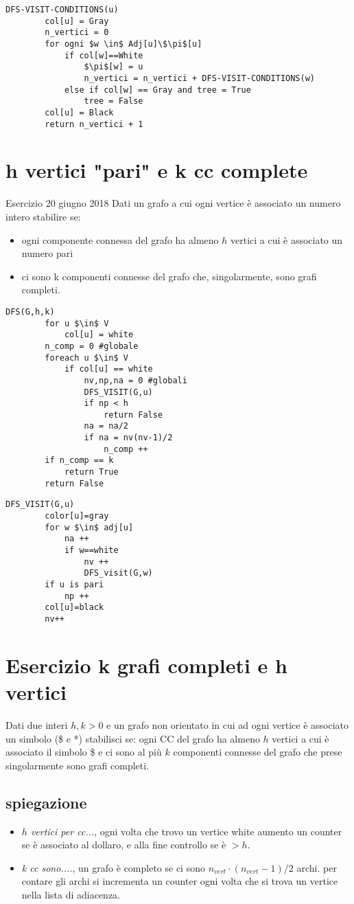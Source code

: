 \documentclass[12pt, a4paper, openany]{book}
\begin{document}
\begin{lstlisting}[mathescape=true]
    DFS-VISIT-CONDITIONS(u)
        col[u] = Gray
        n_vertici = 0
        for ogni $w \in$ Adj[u]\$\pi$[u]
            if col[w]==White
                $\pi$[w] = u
                n_vertici = n_vertici + DFS-VISIT-CONDITIONS(w)
            else if col[w] == Gray and tree = True
                tree = False
        col[u] = Black
        return n_vertici + 1
\end{lstlisting}

\section{h vertici "pari" e k cc complete} Esercizio 20 giugno 2018
Dati un grafo a cui ogni vertice è associato un numero intero stabilire se:
\begin{itemize}
	\item ogni componente connessa del grafo ha almeno $h$ vertici a cui è associato un numero pari
	\item ci sono k componenti connesse del grafo che, singolarmente, sono grafi completi.
\end{itemize}
\begin{lstlisting}[style = small]
	DFS(G,h,k)
		for u $\in$ V
			col[u] = white
		n_comp = 0 #globale
		foreach u $\in$ V
			if col[u] == white
				nv,np,na = 0 #globali
				DFS_VISIT(G,u)
				if np < h
					return False
				na = na/2
				if na = nv(nv-1)/2
					n_comp ++
		if n_comp == k
			return True
		return False
\end{lstlisting}

\begin{lstlisting}[style = small]
	DFS_VISIT(G,u)
		color[u]=gray
		for w $\in$ adj[u]
			na ++
			if w==white
				nv ++
				DFS_visit(G,w)
		if u is pari
			np ++
		col[u]=black
		nv++
\end{lstlisting}
\section{Esercizio k grafi completi e h vertici}
Dati due interi $h,k>0$ e un grafo non orientato  in cui ad ogni vertice è associato un simbolo (\$ e *)
stabilisci se: ogni CC del grafo ha almeno $h$ vertici a cui è associato il simbolo \$
e ci sono al più $k$ componenti connesse del grafo che prese singolarmente sono grafi completi.

\subsection*{spiegazione}
\begin{itemize}
	\item \emph{$h$ vertici per cc...}, ogni volta che trovo un vertice white aumento un counter se è associato al dollaro, e alla fine controllo se è $> h$.
	\item \emph{k cc sono....}, un grafo è completo se ci sono $n_{vert} \cdot (n_{vert} -1)/2$ archi. per contare gli archi si incrementa un counter ogni volta che si trova un vertice nella lista di adiacenza.
\end{itemize}
\end{document}
